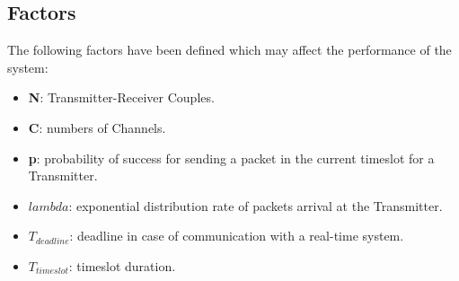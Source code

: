 \subsection{Factors}
The following factors have been defined which may affect the performance of the system:
\begin{itemize}
	\item \textbf{N}: Transmitter-Receiver Couples.
	\item \textbf{C}: numbers of Channels.
	\item \textbf{p}: probability of success for sending a packet in the current timeslot for a Transmitter.
	\item \textbf{$lambda$}: exponential distribution rate of packets arrival at the Transmitter.
	\item $T_{deadline}$: deadline in case of communication with a real-time system.
	\item $T_{timeslot}$: timeslot duration.
	
\end{itemize}